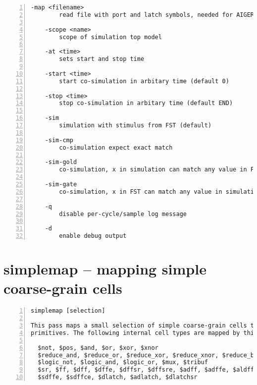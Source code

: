 \begin{lstlisting}[numbers=left,frame=single]
    -map <filename>
        read file with port and latch symbols, needed for AIGER witness input

    -scope <name>
        scope of simulation top model

    -at <time>
        sets start and stop time

    -start <time>
        start co-simulation in arbitary time (default 0)

    -stop <time>
        stop co-simulation in arbitary time (default END)

    -sim
        simulation with stimulus from FST (default)

    -sim-cmp
        co-simulation expect exact match

    -sim-gold
        co-simulation, x in simulation can match any value in FST

    -sim-gate
        co-simulation, x in FST can match any value in simulation

    -q
        disable per-cycle/sample log message

    -d
        enable debug output
\end{lstlisting}

\section{simplemap -- mapping simple coarse-grain cells}
\label{cmd:simplemap}
\begin{lstlisting}[numbers=left,frame=single]
    simplemap [selection]

This pass maps a small selection of simple coarse-grain cells to yosys gate
primitives. The following internal cell types are mapped by this pass:

  $not, $pos, $and, $or, $xor, $xnor
  $reduce_and, $reduce_or, $reduce_xor, $reduce_xnor, $reduce_bool
  $logic_not, $logic_and, $logic_or, $mux, $tribuf
  $sr, $ff, $dff, $dffe, $dffsr, $dffsre, $adff, $adffe, $aldff, $aldffe, $sdff,
  $sdffe, $sdffce, $dlatch, $adlatch, $dlatchsr
\end{lstlisting}

